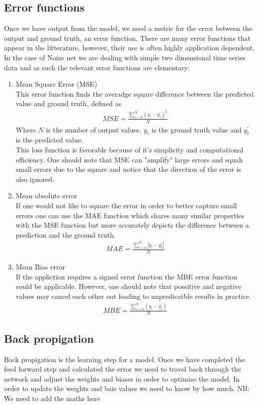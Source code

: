 \documentclass{article}
\begin{document}
\subsection{Error functions}
\label{sec:error}
Once we have output from the model, we need a metric for the error between the output and ground truth, an error function. There are many error functions that appear in the litterature, however, their use is often highly application dependent. In the case of Noize net we are dealing with simple two dimensional time series data and as such the relevant error functions are elementary:
\begin{enumerate}
\item Mean Square Error (MSE)\\
This error function finds the averadge square difference between the predicted value and ground truth, defined as
\begin{align*}
MSE = \frac{\sum_{i=0}^N (y_i - y_i^\prime)^2}{N}
\end{align*}
Where $N$ is the number of output values, $y_i$ is the ground truth value and $y_i^\prime$ is the predicted value. \\
This loss function is favorable because of it's simplicity and computational efficiency. One should note that MSE can "amplify" large errors and squah small errors due to the square and notice that the direction of the error is also ignored.  
\item Mean absolute error \\
If one would not like to square the error in order to better capture small errors one can use the MAE function which shares many similar properties with the MSE function but more accurately depicts the difference between a prediction and the ground truth. 
\begin{align*}
MAE = \frac{\sum_{i=0}^N |y_i - y_i^\prime|}{N}
\end{align*}
\item Mean Bias error \\
If the appliction requires a signed error function the MBE error function could be applicable. However, one should note that possitive and negative values may cancel each other out leading to unpredicatble results in practice. 
\begin{align*}
MBE = \frac{\sum_{i=0}^N (y_i - y_i^\prime)}{N}
\end{align*}
\end{enumerate}
\subsection{Back propigation}
\label{sec:back}
Back propigation is the learning step for a model. Once we have completed the feed forward step and calculated the error we need to travel back through the network and adjust the weights and biases in order to optimize the model. In order to update the weights and bais values we need to know by how much.  
NB: We need to add the maths here 
\end{document}
